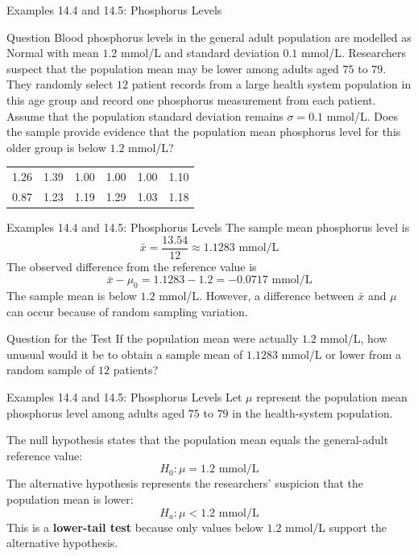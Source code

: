 \documentclass[aspectratio=169]{beamer}
\begin{document}
\begin{frame}{Examples 14.4 and 14.5: Phosphorus Levels}
\begin{block}{Question}
Blood phosphorus levels in the general adult population are modelled as Normal with mean $1.2$ mmol/L and standard deviation $0.1$ mmol/L. Researchers suspect that the population mean may be lower among adults aged $75$ to $79$. They randomly select $12$ patient records from a large health system population in this age group and record one phosphorus measurement from each patient. Assume that the population standard deviation remains $\sigma=0.1$ mmol/L. Does the sample provide evidence that the population mean phosphorus level for this older group is below $1.2$ mmol/L?
\end{block}

\small
\begin{center}
\begin{tabular}{rrrrrr}
\toprule
1.26 & 1.39 & 1.00 & 1.00 & 1.00 & 1.10 \\
0.87 & 1.23 & 1.19 & 1.29 & 1.03 & 1.18 \\
\bottomrule
\end{tabular}
\end{center}
\end{frame}

\begin{frame}{Examples 14.4 and 14.5: Phosphorus Levels}
The sample mean phosphorus level is
$$\bar{x}=\frac{13.54}{12}\approx1.1283\text{ mmol/L}$$
The observed difference from the reference value is
$$\bar{x}-\mu_0=1.1283-1.2=-0.0717\text{ mmol/L}$$
The sample mean is below $1.2$ mmol/L. However, a difference between $\bar{x}$ and $\mu$ can occur because of random sampling variation.

\begin{block}{Question for the Test}
If the population mean were actually $1.2$ mmol/L, how unusual would it be to obtain a sample mean of $1.1283$ mmol/L or lower from a random sample of $12$ patients?
\end{block}
\end{frame}

\begin{frame}{Examples 14.4 and 14.5: Phosphorus Levels}
Let $\mu$ represent the population mean phosphorus level among adults aged $75$ to $79$ in the health-system population.

\vspace{0.2cm}
The null hypothesis states that the population mean equals the general-adult reference value:
$$H_0:\mu=1.2\text{ mmol/L}$$
The alternative hypothesis represents the researchers' suspicion that the population mean is lower:
$$H_a:\mu<1.2\text{ mmol/L}$$
This is a \textbf{lower-tail test} because only values below $1.2$ mmol/L support the alternative hypothesis.
\end{frame}
\end{document}
